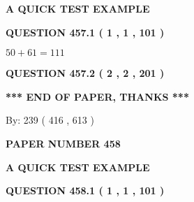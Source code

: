 \documentclass[12pt]{article}
\begin{document}
   
\vspace{0.2in}
   
   
   
   
   
   
 \vspace{0.2in}
{\LARGE {\textbf{ A QUICK TEST EXAMPLE}}}
   
   
  
\vspace{0.2in}
  
{\textbf{\Large{QUESTION
457.1 
 ( 1 , 1 , 101 )
}}}
  
  
 
 

$ %
50 +  %
61=   %
111$
 
 
  
\vspace{0.2in}
  
{\textbf{\Large{QUESTION
457.2 
 ( 2 , 2 , 201 )
}}}
  
  
   
   
 \vspace{0.2in}
 
   
   
   
   
\vspace{1.0in} 
{\textbf{\large{ *** END OF PAPER, THANKS *** }}} 
   
   
\hspace{1.0in} By: 
 239 ( 416 ,  613 )
   
   
   
   
\newpage 
\setcounter{page}{ 
   458001 } 
   
   
   
   
 {\textbf{ \Large{ PAPER NUMBER  458  }}}
   
   
\vspace{0.2in}
   
   
   
   
   
   
 \vspace{0.2in}
{\LARGE {\textbf{ A QUICK TEST EXAMPLE}}}
   
   
  
\vspace{0.2in}
  
{\textbf{\Large{QUESTION
458.1 
 ( 1 , 1 , 101 )
}}}
  
\end{document}

